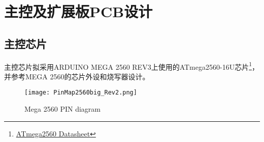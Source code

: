 \chapter{主控及扩展板PCB设计}
\label{cha:PCB}

\section{主控芯片}

主控芯片拟采用ARDUINO MEGA 2560 REV3\cite{arduino_mega-2560-r3}上使用的ATmega2560-16U芯片\footnote{\href{http://www.atmel.com/Images/Atmel-2549-8-bit-AVR-Microcontroller-ATmega640-1280-1281-2560-2561_datasheet.pdf}{ATmega2560 Datasheet}}，并参考MEGA 2560的芯片外设和烧写器设计。

\begin{figure}[htbp]
    \centering
    \texttt{[image: PinMap2560big\_Rev2.png]}
    \caption{Mega 2560 PIN diagram}
    \label{fig:PinMap2560}
\end{figure}

